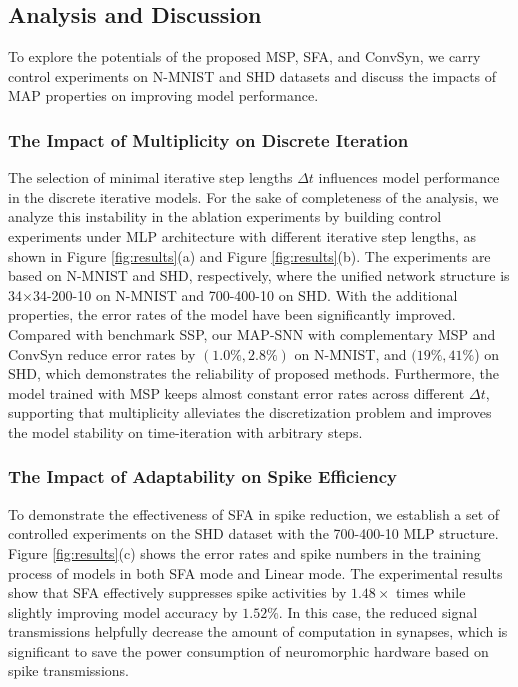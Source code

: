 \documentclass{article}
\begin{document}
\subsection{Analysis and Discussion}
To explore  the potentials of the proposed MSP, SFA, and ConvSyn, we carry control experiments on N-MNIST and SHD datasets and discuss the impacts of MAP properties on improving model performance.







\subsubsection{The Impact of Multiplicity on Discrete Iteration}
The selection of minimal iterative step lengths $\Delta t$ influences model performance in the discrete iterative models. For the sake of completeness of the analysis, we analyze this instability in the ablation experiments by building control experiments under MLP architecture with different iterative step lengths, as shown in Figure \ref{fig:results}(a) and Figure \ref{fig:results}(b). The experiments are based on N-MNIST and SHD, respectively, where the unified network structure is 34$\times$34-200-10 on N-MNIST and 700-400-10 on SHD. 
With the additional properties, the error rates of the model have been significantly improved. Compared with benchmark SSP, our MAP-SNN with complementary MSP and ConvSyn reduce error rates by $(1.0\%,2.8\%)$ on N-MNIST, and $(19\%,41\%$) on SHD, which demonstrates the reliability of proposed methods. Furthermore, the model trained with MSP keeps almost constant error rates across different $\Delta t$, supporting that multiplicity alleviates the discretization problem and improves the model stability on time-iteration with arbitrary steps.



\subsubsection{The Impact of Adaptability on Spike Efficiency }
To demonstrate the effectiveness of SFA in spike reduction, we establish a set of controlled experiments on the SHD dataset with the 700-400-10 MLP structure. Figure \ref{fig:results}(c) shows the error rates and spike numbers in the training process of models in both SFA mode and Linear mode. The experimental results show that SFA effectively suppresses spike activities by $1.48\times$ times while slightly improving model accuracy by $1.52\%$. In this case, the reduced signal transmissions helpfully decrease the amount of computation in synapses, which is significant to save the power consumption of neuromorphic hardware based on spike transmissions.
\end{document}
